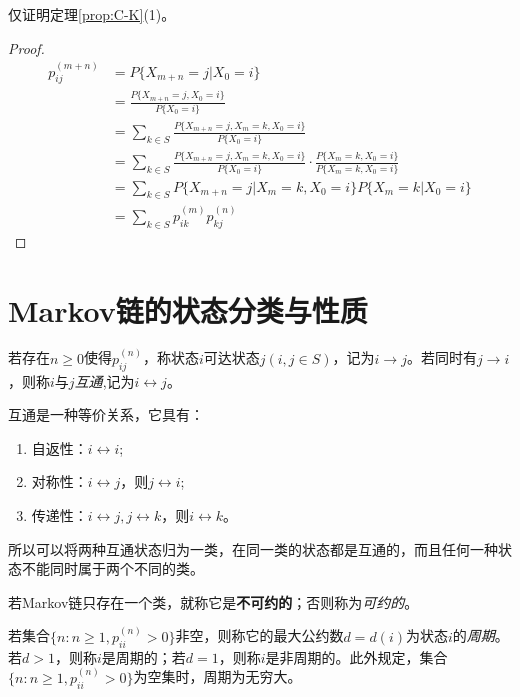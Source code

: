 仅证明定理\ref{prop:C-K}(1)。

\begin{proof}
	\begin{align*}
		p_{ij}^{(m+n)}
		 & =P\{X_{m+n}=j|X_0=i\}                                       \\
		 & =\frac{P\{X_{m+n}=j,X_0=i\}}{P\{X_0=i\}}                    \\
		 & =\sum_{k\in S}\frac{P\{X_{m+n}=j,X_m=k,X_0=i\}}{P\{X_0=i\}} \\
		 & =\sum_{k\in S}\frac{P\{X_{m+n}=j,X_m=k,X_0=i\}}{P\{X_0=i\}}
		\cdot\frac{P\{X_m=k,X_0=i\}}{P\{X_m=k,X_0=i\}}                 \\
		 & =\sum_{k\in S} P\{X_{m+n}=j|X_m=k,X_0=i\}P\{X_m=k|X_0=i\}   \\
		 & =\sum_{k\in S}p_{ik}^{(m)}p_{kj}^{(n)}
	\end{align*}
\end{proof}

\section{Markov链的状态分类与性质}

\begin{definition}\label{def:IntPer}
	若存在\(n\geqslant 0\)使得\(p_{ij}^{(n)}\)，称状态\(i\)可达状态\(j(i,j\in S)\)，记为\(i\rightarrow j\)。若同时有\(j\rightarrow i\)，则称\(i\)与\(j\)\emph{互通},记为\(i\leftrightarrow j\)。
\end{definition}

互通是一种等价关系，它具有：
\begin{enumerate}[\bfseries (1)]
	\item 自返性：\(i\leftrightarrow i\);
	\item 对称性：\(i\leftrightarrow j\)，则\(j\leftrightarrow i\);
	\item 传递性：\(i\leftrightarrow j,j\leftrightarrow k\)，则\(i\leftrightarrow k\)。
\end{enumerate}

所以可以将两种互通状态归为一类，在同一类的状态都是互通的，而且任何一种状态不能同时属于两个不同的类。

\begin{definition}\label{def:Reducible}
	若Markov链只存在一个类，就称它是\textbf{不可约的}；否则称为\emph{可约的}。
\end{definition}

\begin{definition}\label{def:Period}
	若集合\(\{n:n\geqslant 1,p_{ii}^{(n)}>0\}\)非空，则称它的最大公约数\(d=d(i)\)为状态\(i\)的\emph{周期}。若\(d>1\)，则称\(i\)是周期的；若\(d=1\)，则称\(i\)是非周期的。此外规定，集合\(\{n:n\geqslant 1,p_{ii}^{(n)}>0\}\)为空集时，周期为无穷大。
\end{definition}

